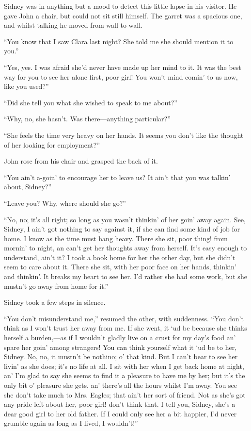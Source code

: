 {}Sidney was in anything but a mood to detect this little lapse in his
visitor. He gave John a chair, but could not sit still himself. The
garret was a spacious one, and whilst talking he moved from wall to
wall.

``You know that I saw Clara last night? She told me she should mention
it to you.''

``Yes, yes. I was afraid she'd never have made up her mind to it. It was
the best way for you to see her alone first, poor girl! You won't mind
comin' to us now, like you used?''

``Did she tell you what she wished to speak to me about?''

``Why, no, she hasn't. Was there---anything particular?''

``She feels the time very heavy on her hands. It seems you don't like
the thought of her looking for employment?''

John rose from his chair and grasped the back of it.

``You ain't a-goin' to encourage her to leave us? It ain't that you was
talkin' about, Sidney?''

``Leave you? Why, where should she go?''

``No, no; it's all right; so long as you wasn't thinkin' of her goin'
away again. See, {}Sidney, I ain't got nothing to say against it, if she
can find some kind of job for home. I know as the time must hang heavy.
There she sit, poor thing! from mornin' to night, an can't get her
thoughts away from herself. It's easy enough to understand, ain't it? I
took a book home for her the other day, but she didn't seem to care
about it. There she sit, with her poor face on her hands, thinkin' and
thinkin'. It breaks my heart to see her. I'd rather she had some work,
but she mustn't go away from home for it.''

Sidney took a few steps in silence.

``You don't misunderstand me,'' resumed the other, with suddenness.
``You don't think as I won't trust her away from me. If she went, it `ud
be because she thinks herself a burden,---as if I wouldn't gladly live
on a crust for my day's food an' spare her goin' among strangers! You
can think yourself what it `ud be to her, Sidney. No, no, it mustn't be
nothino; o' that kind. But I can't bear to see her livin' as she does;
it's no life at all. I sit with her when I get back home at night, an'
I'm glad to say she seems to find it a pleasure to have me by her; but
it's the only bit o' {}pleasure she gets, an' there's all the hours
whilst I'm away. You see she don't take much to Mrs. Eagles; that ain't
her sort of friend. Not as she's got any pride left about her, poor
girl! don't think that. I tell you, Sidney, she's a dear good girl to
her old father. If I could only see her a bit happier, I'd never grumble
again as long as I lived, I wouldn't!''

